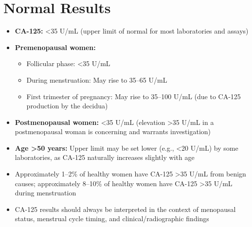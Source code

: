 \section*{Normal Results}
\begin{itemize}
  \item \textbf{CA-125:} <35 U/mL (upper limit of normal for most laboratories and assays)
  \item \textbf{Premenopausal women:}
  \begin{itemize}
    \item Follicular phase: <35 U/mL
    \item During menstruation: May rise to 35--65 U/mL
    \item First trimester of pregnancy: May rise to 35--100 U/mL (due to CA-125 production by the decidua)
  \end{itemize}
  \item \textbf{Postmenopausal women:} <35 U/mL (elevation >35 U/mL in a postmenopausal woman is concerning and warrants investigation)
  \item \textbf{Age >50 years:} Upper limit may be set lower (e.g., <20 U/mL) by some laboratories, as CA-125 naturally increases slightly with age
  \item Approximately 1--2\% of healthy women have CA-125 >35 U/mL from benign causes; approximately 8--10\% of healthy women have CA-125 >35 U/mL during menstruation
  \item CA-125 results should always be interpreted in the context of menopausal status, menstrual cycle timing, and clinical/radiographic findings
\end{itemize}

